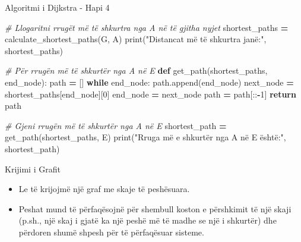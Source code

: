 \documentclass[
  ignorenonframetext,
]{beamer}
\newenvironment{Shaded}{\begin{snugshade}}{\end{snugshade}}
\newcommand{\BuiltInTok}[1]{#1}
\newcommand{\CommentTok}[1]{\textcolor[rgb]{0.56,0.35,0.01}{\textit{#1}}}
\newcommand{\ControlFlowTok}[1]{\textcolor[rgb]{0.13,0.29,0.53}{\textbf{#1}}}
\newcommand{\DecValTok}[1]{\textcolor[rgb]{0.00,0.00,0.81}{#1}}
\newcommand{\KeywordTok}[1]{\textcolor[rgb]{0.13,0.29,0.53}{\textbf{#1}}}
\newcommand{\NormalTok}[1]{#1}
\newcommand{\OperatorTok}[1]{\textcolor[rgb]{0.81,0.36,0.00}{\textbf{#1}}}
\newcommand{\StringTok}[1]{\textcolor[rgb]{0.31,0.60,0.02}{#1}}
\begin{document}
\begin{frame}[fragile]{Algoritmi i Dijkstra - Hapi 4}
\protect\hypertarget{algoritmi-i-dijkstra---hapi-4-3}{}

\begin{Shaded}
\begin{Highlighting}[]
\CommentTok{\# Llogaritni rrugët më të shkurtra nga \textquotesingle{}A\textquotesingle{} në të gjitha nyjet}
\NormalTok{shortest\_paths }\OperatorTok{=}\NormalTok{ calculate\_shortest\_paths(G, }\StringTok{\textquotesingle{}A\textquotesingle{}}\NormalTok{)}
\BuiltInTok{print}\NormalTok{(}\StringTok{"Distancat më të shkurtra janë:"}\NormalTok{, shortest\_paths)}

\CommentTok{\# Për rrugën më të shkurtër nga A në E}
\KeywordTok{def}\NormalTok{ get\_path(shortest\_paths, end\_node):}
\NormalTok{    path }\OperatorTok{=}\NormalTok{ []}
    \ControlFlowTok{while}\NormalTok{ end\_node:}
\NormalTok{        path.append(end\_node)}
\NormalTok{        next\_node }\OperatorTok{=}\NormalTok{ shortest\_paths[end\_node][}\DecValTok{0}\NormalTok{]}
\NormalTok{        end\_node }\OperatorTok{=}\NormalTok{ next\_node}
\NormalTok{    path }\OperatorTok{=}\NormalTok{ path[::}\OperatorTok{{-}}\DecValTok{1}\NormalTok{]}
    \ControlFlowTok{return}\NormalTok{ path}

\CommentTok{\# Gjeni rrugën më të shkurtër nga A në E}
\NormalTok{shortest\_path }\OperatorTok{=}\NormalTok{ get\_path(shortest\_paths, }\StringTok{\textquotesingle{}E\textquotesingle{}}\NormalTok{)}
\BuiltInTok{print}\NormalTok{(}\StringTok{"Rruga më e shkurtër nga A në E është:"}\NormalTok{, shortest\_path)}
\end{Highlighting}
\end{Shaded}
\end{frame}

\begin{frame}{Krijimi i Grafit}
\protect\hypertarget{krijimi-i-grafit}{}
\begin{itemize}
\item
  Le të krijojmë një graf me skaje të peshësuara.
\item
  Peshat mund të përfaqësojnë për shembull koston e përshkimit të një
  skaji (p.sh., një skaj i gjatë ka një peshë më të madhe se një i
  shkurtër) dhe përdoren shumë shpesh për të përfaqësuar sisteme.
\end{itemize}
\end{frame}
\end{document}
